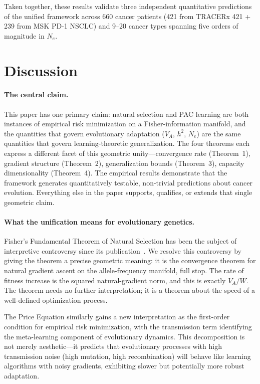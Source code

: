 \documentclass[12pt]{article}
\theoremstyle{remark}
\begin{document}
Taken together, these results validate three independent quantitative predictions of the unified framework across 660 cancer patients (421 from TRACERx 421 + 239 from MSK PD-1 NSCLC) and 9--20 cancer types spanning five orders of magnitude in $N_e$.

\section{Discussion}

\paragraph{The central claim.} This paper has one primary claim: natural selection and PAC learning are both instances of empirical risk minimization on a Fisher-information manifold, and the quantities that govern evolutionary adaptation ($V_A$, $h^2$, $N_e$) are the same quantities that govern learning-theoretic generalization. The four theorems each express a different facet of this geometric unity---convergence rate (Theorem~1), gradient structure (Theorem~2), generalization bounds (Theorem~3), capacity dimensionality (Theorem~4). The empirical results demonstrate that the framework generates quantitatively testable, non-trivial predictions about cancer evolution. Everything else in the paper supports, qualifies, or extends that single geometric claim.

\paragraph{What the unification means for evolutionary genetics.} Fisher's Fundamental Theorem of Natural Selection has been the subject of interpretive controversy since its publication~\cite{ewens1989,lessard1997,price1972,grafen2003}. We resolve this controversy by giving the theorem a precise geometric meaning: it is the convergence theorem for natural gradient ascent on the allele-frequency manifold, full stop. The rate of fitness increase is the squared natural-gradient norm, and this is exactly $V_A/\bar{W}$. The theorem needs no further interpretation; it is a theorem about the speed of a well-defined optimization process.

The Price Equation similarly gains a new interpretation as the first-order condition for empirical risk minimization, with the transmission term identifying the meta-learning component of evolutionary dynamics. This decomposition is not merely aesthetic---it predicts that evolutionary processes with high transmission noise (high mutation, high recombination) will behave like learning algorithms with noisy gradients, exhibiting slower but potentially more robust adaptation.
\end{document}
